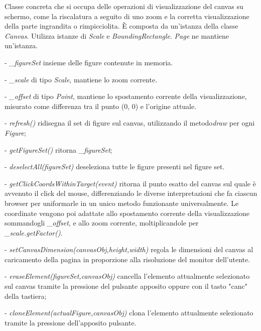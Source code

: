 Classe concreta che si occupa delle operazioni di visualizzazione del canvas su schermo, come la riscalatura a seguito di uno zoom e la corretta visualizzazione della parte ingrandita o rimpicciolita.
\` E composta da un'istanza della classe \textit{Canvas}. Utilizza istanze di \textit{Scale} e \textit{BoundingRectangle}.
\textit{Page} ne mantiene un'istanza.
\begin{elencopuntato}[\subsubsecindent]
\item[-] \textit{{\_}figureSet} insieme delle figure contenute in memoria.
\item[-] \textit{{\_}scale} di tipo \textit{Scale}, mantiene lo zoom corrente.
\item[-] \textit{{\_}offset} di tipo \textit{Point}, mantiene lo spostamento corrente della visualizzazione, misurato come differenza tra il punto (0, 0) e l'origine attuale.
\end{elencopuntato}
\begin{elencopuntato}[\subsubsecindent]
\item[-] \textit{refresh()} ridisegna il set di figure sul canvas, utilizzando il metodo\textit{draw} per ogni \textit{Figure};
\item[-] \textit{getFigureSet()} ritorna \textit{{\_}figureSet};
\item[-] \textit{deselectAll(figureSet)} deseleziona tutte le figure presenti nel figure set.
\item[-] \textit{getClickCoordsWithinTarget(event)} ritorna il punto esatto del canvas sul quale \`  e avvenuto il click  del mouse, differenziando le diverse interpretazioni che fa ciascun browser per uniformarle in un unico metodo funzionante universalmente.
Le coordinate vengono poi adattate allo spostamento corrente della visualizzazione sommandogli \textit{{\_}offset}, e allo zoom corrente, moltiplicandole per \textit{{\_}scale.getFactor()}.
\item[-] \textit{setCanvasDimension(canvasObj,height,width)} regola le dimensioni del canvas al caricamento della pagina in proporzione alla risoluzione del monitor dell'utente.
\item[-] \textit{eraseElement(figureSet,canvasObj)} cancella l'elemento attualmente selezionato sul canvas tramite la pressione del pulsante apposito oppure con il tasto "canc" della tastiera;
\item[-] \textit{cloneElement(actualFigure,canvasObj)} clona l'elemento attualmente selezionato tramite la pressione dell'apposito pulsante.
\end{elencopuntato}

